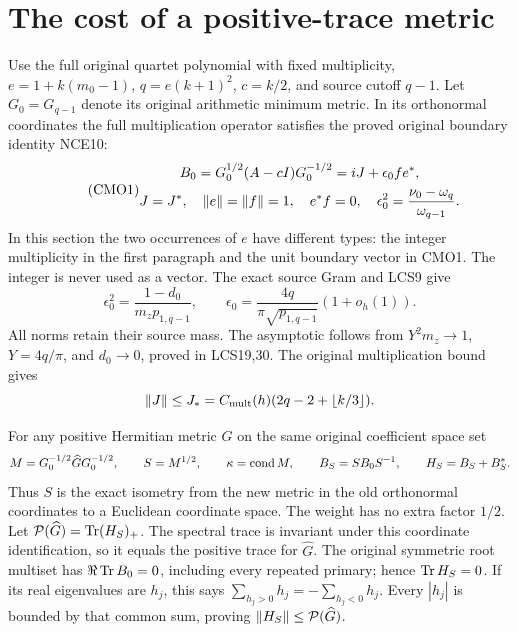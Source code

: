 \section{The cost of a positive-trace metric}
Use the full original quartet polynomial with fixed multiplicity,
$e=1+k(m_0-1)$, $q=e(k+1)^2$, $c=k/2$, and source cutoff $q-1$.
Let $G_0=G_{q-1}$ denote its original arithmetic minimum metric.
In its orthonormal coordinates the full multiplication operator
satisfies the proved original boundary identity NCE10:
\begin{equation}\tag{CMO1}
 \begin{gathered}
 B_0=G_0^{1/2}(A-cI)G_0^{-1/2}=iJ+\epsilon_0fe^*,\\
 J=J^*,\quad \left\lVert e\right\rVert=\left\lVert f\right\rVert=1,\quad e^*f=0,\quad
 \epsilon_0^2=\frac{\nu_0-\omega_q}{\omega_{q-1}} .
 \end{gathered}
\end{equation}
In this section the two occurrences of $e$ have different types:
the integer multiplicity in the first paragraph and the unit
boundary vector in CMO1. The integer is never used as a vector.
The exact source Gram and LCS9 give
\begin{equation}\tag{CMO2}
 \epsilon_0^2=\frac{1-d_0}{m_zp_{1,q-1}},\qquad
 \epsilon_0=\frac{4q}{\pi\sqrt{p_{1,q-1}}}(1+o_h(1)).
\end{equation}
All norms retain their source mass. The asymptotic follows from
$Y^2m_z\to1$, $Y=4q/\pi$, and $d_0\to0$, proved in LCS19,30.
The original multiplication bound gives
\[
 \left\lVert J\right\rVert\le J_*=
 C_{\rm mult}(h)(2q-2+\lfloor k/3\rfloor).
\]

For any positive Hermitian metric $\widehat G$ on the same
original coefficient space set
\[
 M=G_0^{-1/2}\widehat G G_0^{-1/2},\qquad
 S=M^{1/2},\qquad \kappa=\operatorname{cond} M,\qquad
 B_S=SB_0S^{-1},\qquad H_S=B_S+B_S^* .
\]
Thus $S$ is the exact isometry from the new metric in the old
orthonormal coordinates to a Euclidean coordinate space.
The weight has no extra factor $1/2$.
Let $\mathcal P(\widehat G)=\operatorname{Tr}(H_S)_+$.
The spectral trace is invariant under this coordinate
identification, so it equals the positive trace for $\widehat G$.
The original symmetric root multiset has $\Re\operatorname{Tr} B_0=0$,
including every repeated primary; hence $\operatorname{Tr} H_S=0$.
If its real eigenvalues are $h_j$, this says
$\sum_{h_j>0}h_j=-\sum_{h_j<0}h_j$.
Every $|h_j|$ is bounded by that common sum, proving
$\left\lVert H_S\right\rVert\le\mathcal P(\widehat G)$.

